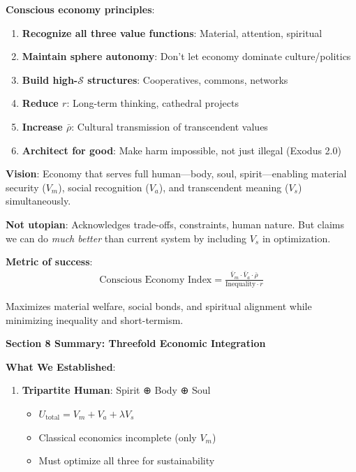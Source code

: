 \documentclass[11pt,a4paper]{article}
\theoremstyle{definition}
\theoremstyle{remark}
\begin{document}
\begin{small}
\begin{enumerate}
\begin{mdframed}[backgroundcolor=purple!10,linewidth=2pt]
\textbf{Conscious economy principles}:
\begin{enumerate}
    \item \textbf{Recognize all three value functions}: Material, attention, spiritual
    \item \textbf{Maintain sphere autonomy}: Don't let economy dominate culture/politics
    \item \textbf{Build high-\(\mathcal{S}\) structures}: Cooperatives, commons, networks
    \item \textbf{Reduce \(r\)}: Long-term thinking, cathedral projects
    \item \textbf{Increase \(\bar{\rho}\)}: Cultural transmission of transcendent values
    \item \textbf{Architect for good}: Make harm impossible, not just illegal (Exodus 2.0)
\end{enumerate}

\textbf{Vision}: Economy that serves full human—body, soul, spirit—enabling material security (\(V_m\)), social recognition (\(V_a\)), and transcendent meaning (\(V_s\)) simultaneously.

\textbf{Not utopian}: Acknowledges trade-offs, constraints, human nature. But claims we can do \textit{much better} than current system by including \(V_s\) in optimization.

\textbf{Metric of success}:
\begin{align}
\text{Conscious Economy Index} = \frac{\bar{V}_m \cdot \bar{V}_a \cdot \bar{\rho}}{\text{Inequality} \cdot r}
\end{align}

Maximizes material welfare, social bonds, and spiritual alignment while minimizing inequality and short-termism.
\end{mdframed}

\begin{mdframed}[backgroundcolor=green!10,linewidth=2pt,linecolor=green!70!black]
\textbf{Section 8 Summary: Threefold Economic Integration}

\textbf{What We Established}:

\begin{enumerate}[nosep]
    \item \textbf{Tripartite Human}: Spirit ⊕ Body ⊕ Soul
        \begin{itemize}[nosep]
            \item \(U_{\text{total}} = V_m + V_a + \lambda V_s\)
            \item Classical economics incomplete (only \(V_m\))
            \item Must optimize all three for sustainability
        \end{itemize}
    

\end{enumerate}
\end{mdframed}
\end{enumerate}
\end{small}
\end{document}
